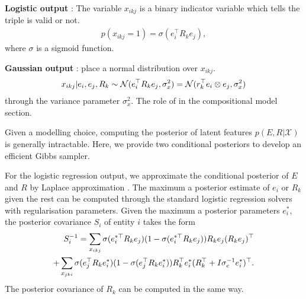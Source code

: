 \textbf{Logistic output }: The variable $x_{ikj}$ is a 
binary indicator variable which tells the triple is valid or not.
\begin{align}
p(x_{ikj}=1) = \sigma(e_i^{\top} R_k e_j),
\end{align}
where $\sigma$ is a sigmoid function.

\textbf{Gaussian output }:
 place a normal distribution over $x_{ikj}$.
\begin{align}
x_{ikj} |e_i, e_j, R_k \sim \mathcal{N}(e_i^{\top} R_k e_j, \sigma_x^2) = \mathcal{N}(r_k^{\top} e_i \otimes e_j, \sigma_x^2)  \notag %
\end{align} %
through the variance parameter $\sigma_x^2$. 
The role of  in the compositional model section.

Given a modelling choice, computing the posterior of latent features $p(E, R|
\mathcal{X})$ is generally intractable. Here, we provide two conditional 
posteriors to develop an efficient Gibbs sampler.

For the logistic regression output, we approximate the conditional posterior of 
$E$ and $R$ by Laplace approximation \cite{bishop2006pattern}. The maximum a 
posterior estimate of $e_i$ or $R_k$ given the rest can be computed through the 
standard logistic regression solvers with regularisation parameters. Given the 
maximum a posterior parameters $e_i^*$, the posterior covariance $S_i$ of entity 
$i$ takes the form
\begin{align}
S_i^{-1} = \sum_{x_{ikj}} \sigma(e_{i}^{*\top} R_k e_{j}) (1 - \sigma(e_{i}^{*\top} R_k e_{j})) R_k
e_{j}(R_k e_{j})^\top \notag \\
 + \sum_{x_{jki}} \sigma(e_{j}^{\top} R_k e_{i}^*) ( 1- \sigma(e_{j}^{\top} R_k e_{i}^*)) R_k^\top e^*_{i}(R_k^\top + I\sigma_e^{-1}
e^*_{i})^\top. \notag 
\end{align}
The posterior covariance of $R_k$ can be computed in the same way.


